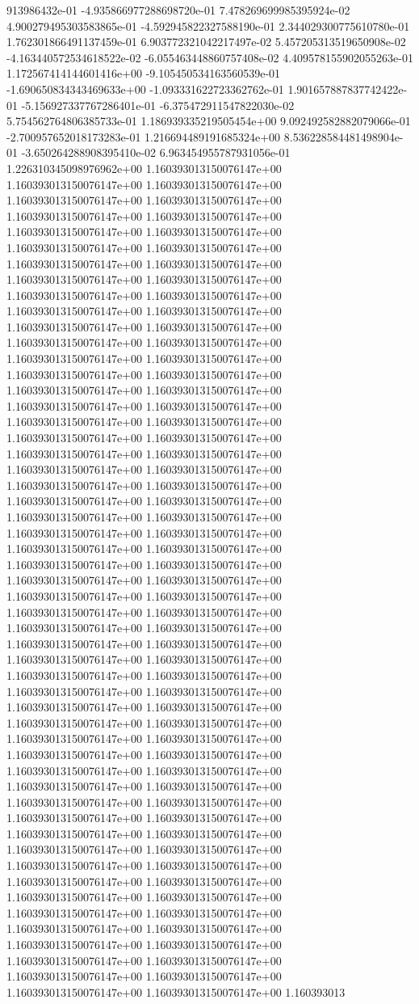 913986432e-01	-4.935866977288698720e-01	7.478269699985395924e-02	4.900279495303583865e-01	-4.592945822327588190e-01	2.344029300775610780e-01	1.762301866491137459e-01	6.903772321042217497e-02	5.457205313519650908e-02	-4.163440572534618522e-02	-6.055463448860757408e-02	4.409578155902055263e-01	1.172567414144601416e+00	-9.105450534163560539e-01	-1.690650834343469633e+00	-1.093331622723362762e-01	1.901657887837742422e-01	-5.156927337767286401e-01	-6.375472911547822030e-02	5.754562764806385733e-01	1.186939335219505454e+00	9.092492582882079066e-01	-2.700957652018173283e-01	1.216694489191685324e+00	8.536228584481498904e-01	-3.650264288908395410e-02	6.963454955787931056e-01	1.226310345098976962e+00
1.160393013150076147e+00	1.160393013150076147e+00	1.160393013150076147e+00	1.160393013150076147e+00	1.160393013150076147e+00	1.160393013150076147e+00	1.160393013150076147e+00	1.160393013150076147e+00	1.160393013150076147e+00	1.160393013150076147e+00	1.160393013150076147e+00	1.160393013150076147e+00	1.160393013150076147e+00	1.160393013150076147e+00	1.160393013150076147e+00	1.160393013150076147e+00	1.160393013150076147e+00	1.160393013150076147e+00	1.160393013150076147e+00	1.160393013150076147e+00	1.160393013150076147e+00	1.160393013150076147e+00	1.160393013150076147e+00	1.160393013150076147e+00	1.160393013150076147e+00	1.160393013150076147e+00	1.160393013150076147e+00	1.160393013150076147e+00	1.160393013150076147e+00	1.160393013150076147e+00	1.160393013150076147e+00	1.160393013150076147e+00	1.160393013150076147e+00	1.160393013150076147e+00	1.160393013150076147e+00	1.160393013150076147e+00	1.160393013150076147e+00	1.160393013150076147e+00	1.160393013150076147e+00	1.160393013150076147e+00	1.160393013150076147e+00	1.160393013150076147e+00	1.160393013150076147e+00	1.160393013150076147e+00	1.160393013150076147e+00	1.160393013150076147e+00	1.160393013150076147e+00	1.160393013150076147e+00	1.160393013150076147e+00	1.160393013150076147e+00	1.160393013150076147e+00	1.160393013150076147e+00	1.160393013150076147e+00	1.160393013150076147e+00	1.160393013150076147e+00	1.160393013150076147e+00	1.160393013150076147e+00	1.160393013150076147e+00	1.160393013150076147e+00	1.160393013150076147e+00	1.160393013150076147e+00	1.160393013150076147e+00	1.160393013150076147e+00	1.160393013150076147e+00	1.160393013150076147e+00	1.160393013150076147e+00	1.160393013150076147e+00	1.160393013150076147e+00	1.160393013150076147e+00	1.160393013150076147e+00	1.160393013150076147e+00	1.160393013150076147e+00	1.160393013150076147e+00	1.160393013150076147e+00	1.160393013150076147e+00	1.160393013150076147e+00	1.160393013150076147e+00	1.160393013150076147e+00	1.160393013150076147e+00	1.160393013150076147e+00	1.160393013150076147e+00	1.160393013150076147e+00	1.160393013150076147e+00	1.160393013150076147e+00	1.160393013150076147e+00	1.160393013150076147e+00	1.160393013150076147e+00	1.160393013150076147e+00	1.160393013150076147e+00	1.160393013150076147e+00	1.160393013150076147e+00	1.160393013150076147e+00	1.160393013150076147e+00	1.160393013150076147e+00	1.160393013150076147e+00	1.160393013150076147e+00	1.160393013150076147e+00	1.160393013150076147e+00	1.160393013150076147e+00	1.160393013150076147e+00	1.160393013150076147e+00	1.160393013150076147e+00	1.160393013150076147e+00	1.160393013150076147e+00	1.160393013150076147e+00	1.160393013